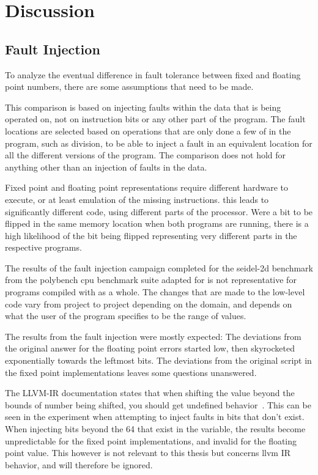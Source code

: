 \section{Discussion}

\subsection{Fault Injection}

To analyze the eventual difference in fault tolerance between fixed and floating point numbers, there are some assumptions that need to be made. 

This comparison is based on injecting faults within the data that is being operated on, not on instruction bits or any other part of the program. The fault locations are selected based on operations that are only done a few of in the program, such as division, to be able to inject a fault in an equivalent location for all the different versions of the program. The comparison does not hold for anything other than an injection of faults in the data. 

Fixed point and floating point representations require different hardware to execute, or at least emulation of the missing instructions. this leads to significantly different code, using different parts of the processor. Were a bit to be flipped in the same memory location when both programs are running, there is a high likelihood of the bit being flipped representing very different parts in the respective programs. 




The results of the fault injection campaign completed for the seidel-2d benchmark from the polybench cpu benchmark suite adapted for \taffo is not representative for programs compiled with \taffo as a whole. The changes that are made to the low-level code vary from project to project depending on the domain, and depends on what the user of the program specifies to be the range of values. 

The results from the fault injection were mostly expected: The deviations from the original answer for the floating point errors started low, then skyrocketed exponentially towards the leftmost bits. The deviations from the original script in the fixed point implementations leaves some questions unanswered.


The LLVM-IR documentation states that when shifting the value beyond the bounds of number being shifted, you should get undefined behavior~\cite{LLVM_language_reference}. This can be seen in the experiment when attempting to inject faults in bits that don't exist. When injecting bits beyond the 64 that exist in the variable, the results become unpredictable for the fixed point implementations, and invalid for the floating point value. This however is not relevant to this thesis but concerns llvm IR behavior, and will therefore be ignored.


